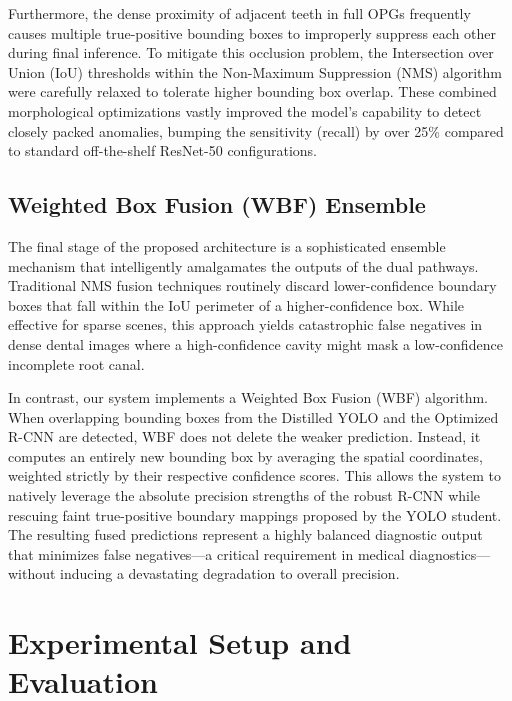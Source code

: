 \documentclass[conference]{IEEEtran}
\begin{document}
Furthermore, the dense proximity of adjacent teeth in full OPGs frequently causes multiple true-positive bounding boxes to improperly suppress each other during final inference. To mitigate this occlusion problem, the Intersection over Union (IoU) thresholds within the Non-Maximum Suppression (NMS) algorithm were carefully relaxed to tolerate higher bounding box overlap. These combined morphological optimizations vastly improved the model's capability to detect closely packed anomalies, bumping the sensitivity (recall) by over 25\% compared to standard off-the-shelf ResNet-50 configurations.

\subsection{Weighted Box Fusion (WBF) Ensemble}
The final stage of the proposed architecture is a sophisticated ensemble mechanism that intelligently amalgamates the outputs of the dual pathways. Traditional NMS fusion techniques routinely discard lower-confidence boundary boxes that fall within the IoU perimeter of a higher-confidence box. While effective for sparse scenes, this approach yields catastrophic false negatives in dense dental images where a high-confidence cavity might mask a low-confidence incomplete root canal. 

In contrast, our system implements a Weighted Box Fusion (WBF) algorithm. When overlapping bounding boxes from the Distilled YOLO and the Optimized R-CNN are detected, WBF does not delete the weaker prediction. Instead, it computes an entirely new bounding box by averaging the spatial coordinates, weighted strictly by their respective confidence scores. This allows the system to natively leverage the absolute precision strengths of the robust R-CNN while rescuing faint true-positive boundary mappings proposed by the YOLO student. The resulting fused predictions represent a highly balanced diagnostic output that minimizes false negatives---a critical requirement in medical diagnostics---without inducing a devastating degradation to overall precision.

\section{Experimental Setup and Evaluation}
\end{document}
